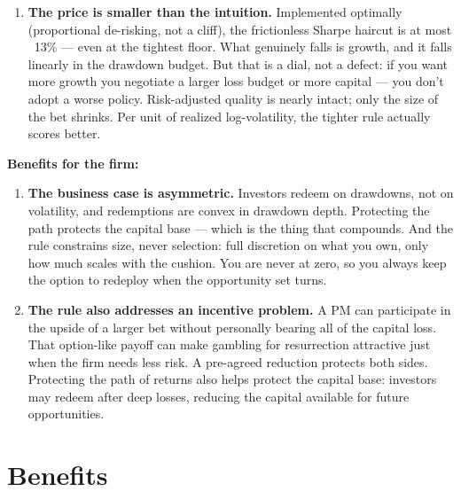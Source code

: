 \documentclass[11pt]{gappyarticle}
\begin{document}
\begin{enumerate}
	\item 
	\textbf{The price is smaller than the intuition.} Implemented optimally (proportional de-risking, not a cliff), the frictionless Sharpe haircut is at most ~13\% — even at the tightest floor. What genuinely falls is growth, and it falls linearly in the drawdown budget. But that is a dial, not a defect: if you want more growth you negotiate a larger loss budget or more capital — you don't adopt a worse policy. Risk-adjusted quality is nearly intact; only the size of the bet shrinks. Per unit of realized log-volatility, the tighter rule actually scores better.
	\end{enumerate}
	\textbf{Benefits for the firm:}
	\begin{enumerate}
	\item
	\textbf{The business case is asymmetric.} Investors redeem on drawdowns, not on volatility, and redemptions are convex in drawdown depth. Protecting the path protects the capital base — which is the thing that compounds. And the rule constrains size, never selection: full discretion on what you own, only how much scales with the cushion. You are never at zero, so you always keep the option to redeploy when the opportunity set turns.
	\item
	\textbf{The rule also addresses an incentive problem.} A PM can participate in the
		upside of a larger bet without personally bearing all of the capital loss.
		That option-like payoff can make gambling for resurrection attractive just
		when the firm needs less risk. A pre-agreed reduction protects both sides.
		Protecting the path of returns also helps protect the capital base: investors
		may redeem after deep losses, reducing the capital available for future
		opportunities.
	\end{enumerate} 
\section{Benefits}
 
\end{document}
